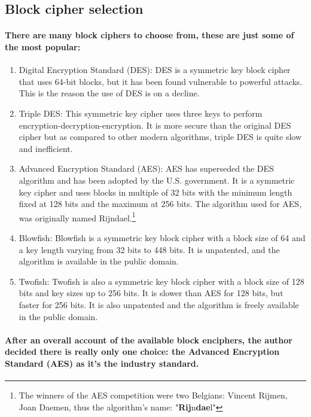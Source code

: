 \subsection{Block cipher selection}
\paragraph{There are many block ciphers to choose from, these are just some of the most popular:}\cite{Nirula}
\begin{enumerate}
\item Digital Encryption Standard (DES): DES is a symmetric key block cipher that uses 64-bit blocks, but it has been found vulnerable to powerful attacks. This is the reason the use of DES is on a decline. 
\item Triple DES: This symmetric key cipher uses three keys to perform encryption-decryption-encryption. It is more secure than the original DES cipher but as compared to other modern algorithms, triple DES is quite slow and inefficient. 
\item Advanced Encryption Standard (AES): AES has superseded the DES algorithm and has been adopted by the U.S. government. It is a symmetric key cipher and uses blocks in multiple of 32 bits with the minimum length fixed at 128 bits and the maximum at 256 bits. The algorithm used for AES, was originally named Rijndael.\footnote{The winners of the AES competition were two Belgians: Vincent Rijmen, Joan Daemen, thus the algorithm's name: "\textbf{Rij}n\textbf{dae}l"}
\item Blowfish: Blowfish is a symmetric key block cipher with a block size of 64 and a key length varying from 32 bits to 448 bits. It is unpatented, and the algorithm is available in the public domain. 
\item Twofish: Twofish is also a symmetric key block cipher with a block size of 128 bits and key sizes up to 256 bits. It is slower than AES for 128 bits, but faster for 256 bits. It is also unpatented and the algorithm is freely available in the public domain.
\end{enumerate}

\paragraph{After an overall account of the available block enciphers, the author decided there is really only one choice: the Advanced Encryption Standard (AES) as it's the industry standard.}

